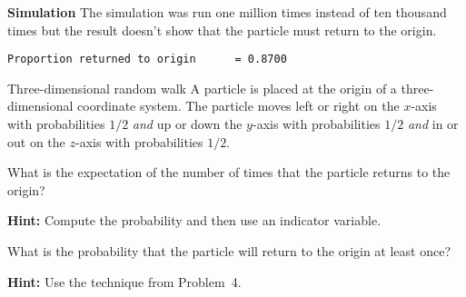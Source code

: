 \textbf{Simulation}
The simulation was run one million times instead of ten thousand times but the result doesn't show that the particle must return to the origin.
\begin{verbatim}
Proportion returned to origin      = 0.8700
\end{verbatim}


\begin{prob}{Three-dimensional random walk}
A particle is placed at the origin of a three-dimensional coordinate system. The particle moves left or right on the $x$-axis with probabilities $1/2$ \emph{and} up or down the $y$-axis with probabilities $1/2$ \emph{and} in or out on the $z$-axis with probabilities $1/2$.

 What is the expectation of the number of times that the particle returns to the origin?

\textbf{Hint:} Compute the probability and then use an indicator variable.

 What is the probability that the particle will return to the origin at least once?

\textbf{Hint:} Use the technique from Problem~4.
\end{prob}

\solution{}

